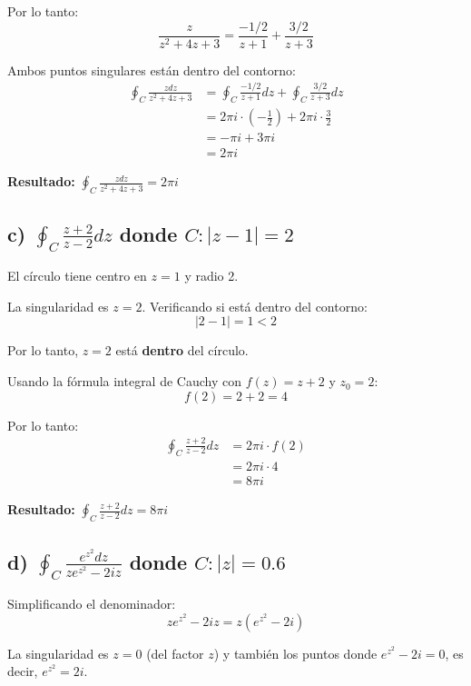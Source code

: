 \documentclass{article}
\begin{document}
Por lo tanto:
$$\frac{z}{z^2 + 4z + 3} = \frac{-1/2}{z + 1} + \frac{3/2}{z + 3}$$

Ambos puntos singulares están dentro del contorno:
\begin{align*}
\oint_C \frac{z dz}{z^2 + 4z + 3} &= \oint_C \frac{-1/2}{z + 1} dz + \oint_C \frac{3/2}{z + 3} dz \\
                                   &= 2\pi i \cdot \left(-\frac{1}{2}\right) + 2\pi i \cdot \frac{3}{2} \\
                                   &= -\pi i + 3\pi i \\
                                   &= 2\pi i
\end{align*}

\textbf{Resultado:} $\oint_C \frac{z dz}{z^2 + 4z + 3} = 2\pi i$

\subsection*{c) $\oint_C \frac{z + 2}{z - 2} dz$ donde $C: |z - 1| = 2$}

El círculo tiene centro en $z = 1$ y radio 2.

La singularidad es $z = 2$. Verificando si está dentro del contorno:
$$|2 - 1| = 1 < 2$$

Por lo tanto, $z = 2$ está \textbf{dentro} del círculo.

Usando la fórmula integral de Cauchy con $f(z) = z + 2$ y $z_0 = 2$:
$$f(2) = 2 + 2 = 4$$

Por lo tanto:
\begin{align*}
\oint_C \frac{z + 2}{z - 2} dz &= 2\pi i \cdot f(2) \\
                                &= 2\pi i \cdot 4 \\
                                &= 8\pi i
\end{align*}

\textbf{Resultado:} $\oint_C \frac{z + 2}{z - 2} dz = 8\pi i$

\subsection*{d) $\oint_C \frac{e^{z^2} dz}{z e^{z^2} - 2iz}$ donde $C: |z| = 0.6$}

Simplificando el denominador:
$$z e^{z^2} - 2iz = z(e^{z^2} - 2i)$$

La singularidad es $z = 0$ (del factor $z$) y también los puntos donde $e^{z^2} - 2i = 0$, es decir, $e^{z^2} = 2i$.
\end{document}
